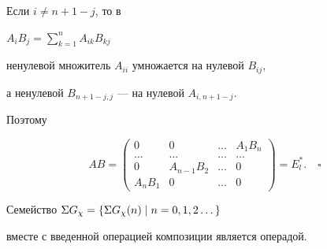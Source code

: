 Если $i\ne n+1-j$, то в


$A_iB_j=\sum\limits_{k=1}^n A_{ik}B_{kj}$


ненулевой множитель $A_{ii}$ умножается на нулевой $B_{ij}$,


а ненулевой $B_{n+1-j,j}$ --- на нулевой $A_{i,n+1-j}$.


Поэтому


$$


AB=


\begin{pmatrix}


0 & 0 & \dotsc & A_1B_n \\


\dotsc & \dotsc & \dotsc & \dotsc \\


0 & A_{n-1}B_2 & \dotsc & 0 \\


A_nB_1 & 0 & \dotsc & 0 


\end{pmatrix}


=E_l^*.\quad\square


$$











\begin{thm}


Семейство $\Sigma G_{\chi}=\{\Sigma G_{\chi}(n)\mid n=0,1,2\dotsc\}$


вместе с введенной операцией композиции является операдой.


\end{thm}





